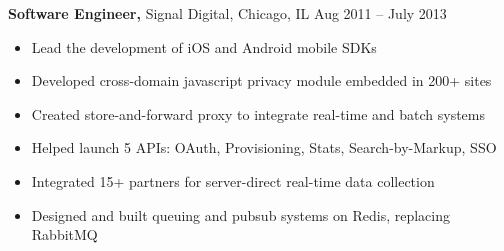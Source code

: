 \documentclass[margin]{res}
\begin{document}
\begin{resume}
 {\bf Software Engineer,} Signal Digital, Chicago, IL \hfill Aug 2011 -- July 2013
 \begin{itemize} \itemsep -2pt  %
  \item Lead the development of iOS and Android mobile SDKs
  \item Developed cross-domain javascript privacy module embedded in 200+ sites
  \item Created store-and-forward proxy to integrate real-time and batch systems
  \item Helped launch 5 APIs: OAuth, Provisioning, Stats, Search-by-Markup, SSO
  \item Integrated 15+ partners for server-direct real-time data collection
  \item Designed and built queuing and pubsub systems on Redis, replacing RabbitMQ
 \end{itemize}





\end{resume}
\end{document}
